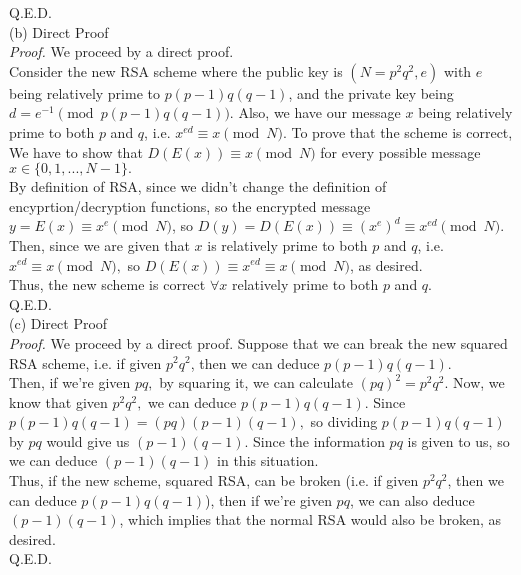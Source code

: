\documentclass{article}
\begin{document}
Q.E.D. \\[.5cm]
(b) Direct Proof \\[.2cm]
\textit{Proof.} We proceed by a direct proof. \\[.1cm]
\indent Consider the new RSA scheme where the public key is $(N = p^2q^2, e)$ with $e$ being relatively prime to $p(p-1)q(q-1)$, and the private key being $d = e^{-1}\pmod{p(p-1)q(q-1)}$. Also, we have our message $x$ being relatively prime to both $p$ and $q$, i.e. $x^{ed}\equiv x\pmod{N}.$ To prove that the scheme is correct, We have to show that $D(E(x))\equiv x\pmod{N}$ for every possible message $x\in\{0,1,...,N-1\}.$\\[.1cm]
\indent By definition of RSA, since we didn't change the definition of encyprtion/decryption functions, so the encrypted message $y = E(x)\equiv x^e\pmod{N}$, so $D(y) = D(E(x))\equiv(x^e)^d\equiv x^{ed}\pmod{N}.$ Then, since we are given that $x$ is relatively prime to both $p$ and $q$, i.e. $x^{ed}\equiv x\pmod{N},$ so $D(E(x))\equiv x^{ed}\equiv x\pmod{N}$, as desired. \\[.1cm]
\indent Thus, the new scheme is correct $\forall x$ relatively prime to both $p$ and $q$. \\[.1cm]
Q.E.D. \\[.5cm]
(c) Direct Proof \\[.2cm]
\textit{Proof.} We proceed by a direct proof. Suppose that we can break the new squared RSA scheme, i.e. if given $p^2q^2$, then we can deduce $p(p-1)q(q-1).$ \\[.1cm]
\indent Then, if we're given $pq,$ by squaring it, we can calculate $(pq)^2 = p^2q^2.$ Now, we know that given $p^2q^2,$ we can deduce $p(p-1)q(q-1)$. Since $p(p-1)q(q-1) = (pq)(p-1)(q-1),$ so dividing $p(p-1)q(q-1)$ by $pq$ would give us $(p-1)(q-1).$ Since the information $pq$ is given to us, so we can deduce $(p-1)(q-1)$ in this situation. \\[.1cm]
\indent Thus, if the new scheme, squared RSA, can be broken (i.e. if given $p^2q^2$, then we can deduce $p(p-1)q(q-1)$), then if we're given $pq$, we can also deduce $(p-1)(q-1)$, which implies that the normal RSA would also be broken, as desired. \\[.1cm]
Q.E.D.
\end{document}
